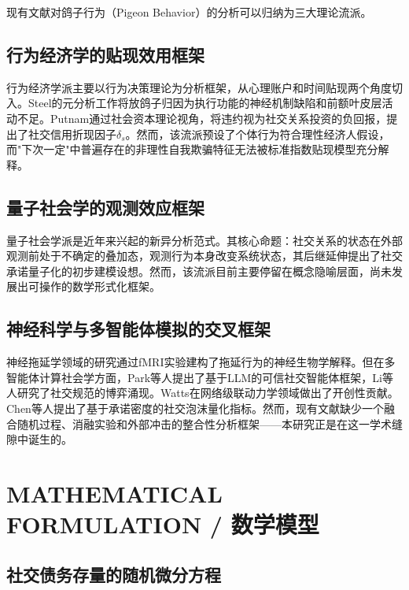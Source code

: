 \documentclass[journal]{IEEEtran}
\newcommand{\citet}[1]{\cite{#1}}
\begin{document}
现有文献对鸽子行为（Pigeon Behavior）的分析可以归纳为三大理论流派。

\subsection{行为经济学的贴现效用框架}

行为经济学派主要以行为决策理论为分析框架，从心理账户和时间贴现两个角度切入。Steel\citet{procrastination}的元分析工作将放鸽子归因为执行功能的神经机制缺陷和前额叶皮层活动不足。Putnam\citet{social_capital}通过社会资本理论视角，将违约视为社交关系投资的负回报，提出了社交信用折现因子$\delta_s$。然而，该流派预设了个体行为符合理性经济人假设，而"下次一定"中普遍存在的非理性自我欺骗特征无法被标准指数贴现模型充分解释。

\subsection{量子社会学的观测效应框架}

量子社会学派是近年来兴起的新异分析范式。其核心命题：社交关系的状态在外部观测前处于不确定的叠加态，观测行为本身改变系统状态\citet{schrodinger_vs_pigeon}，其后继延伸\citet{quantum_social}提出了社交承诺量子化的初步建模设想。然而，该流派目前主要停留在概念隐喻层面，尚未发展出可操作的数学形式化框架。

\subsection{神经科学与多智能体模拟的交叉框架}

神经拖延学领域的研究\citet{procrastination}通过fMRI实验建构了拖延行为的神经生物学解释。但在多智能体计算社会学方面，Park等人\citet{generative_agents}提出了基于LLM的可信社交智能体框架，Li等人\citet{social_learning}研究了社交规范的博弈涌现。Watts\citet{network_collapse}在网络级联动力学领域做出了开创性贡献。Chen等人\citet{social_bubble}提出了基于承诺密度的社交泡沫量化指标\citet{merton_finance}。然而，现有文献缺少一个融合随机过程、消融实验和外部冲击的整合性分析框架——本研究正是在这一学术缝隙中诞生的。

\section{MATHEMATICAL FORMULATION / 数学模型}

\subsection{社交债务存量的随机微分方程}
\end{document}
